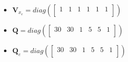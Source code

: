 \documentclass{thesisreport}
\begin{document}
                \begin{itemize}
                
				\item $\bm{V}_{x_e} =
                diag(\begin{bmatrix}
            	1 & 1 & 1 & 1 & 1 & 1 \\
            	\end{bmatrix}) $
                
                \item $\bm{Q} =
            	diag(\begin{bmatrix}
            	30 & 30 & 1 & 5 & 5 & 1 \\
            	\end{bmatrix}) $
                
                \item $\bm{Q}_e =
                diag(\begin{bmatrix}
            	30 & 30 & 1 & 5 & 5 & 1 \\
            	\end{bmatrix}) $
                

\end{itemize}
\end{document}
